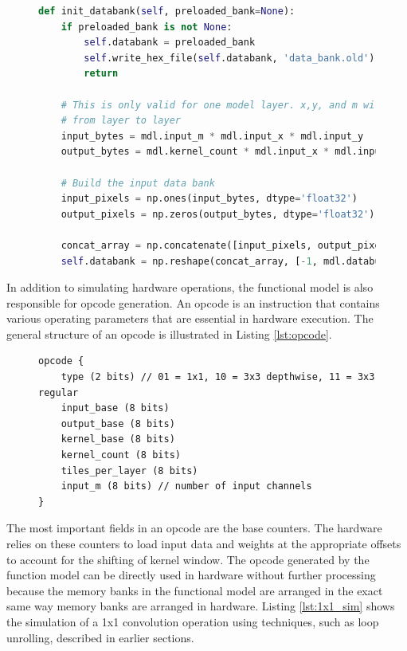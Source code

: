 \documentclass{uw-ece-wkrpt}
\begin{document}
\begin{figure}
\centering
\begin{lstlisting}[caption={Databank initialization in software}, label=lst:databank_init, language=Python]
def init_databank(self, preloaded_bank=None):
    if preloaded_bank is not None:
        self.databank = preloaded_bank
        self.write_hex_file(self.databank, 'data_bank.old')
        return

    # This is only valid for one model layer. x,y, and m will change
    # from layer to layer
    input_bytes = mdl.input_m * mdl.input_x * mdl.input_y
    output_bytes = mdl.kernel_count * mdl.input_x * mdl.input_y

    # Build the input data bank
    input_pixels = np.ones(input_bytes, dtype='float32')
    output_pixels = np.zeros(output_bytes, dtype='float32')

    concat_array = np.concatenate([input_pixels, output_pixels])
    self.databank = np.reshape(concat_array, [-1, mdl.databus_size])
\end{lstlisting}
\end{figure}

In addition to simulating hardware operations, the functional model is also responsible for opcode generation. An opcode is an instruction that contains various operating parameters that are essential in hardware execution. The general structure of an opcode is illustrated in Listing \ref{lst:opcode}.

\begin{figure}
\centering
\begin{lstlisting}[caption={General opcode format}, label=lst:opcode]
opcode {
    type (2 bits) // 01 = 1x1, 10 = 3x3 depthwise, 11 = 3x3 regular
    input_base (8 bits)
    output_base (8 bits)
    kernel_base (8 bits)
    kernel_count (8 bits)
    tiles_per_layer (8 bits)
    input_m (8 bits) // number of input channels
}
\end{lstlisting}
\end{figure}

The most important fields in an opcode are the base counters. The hardware relies on these counters to load input data and weights at the appropriate offsets to account for the shifting of \gls{kernel} window. The opcode generated by the function model can be directly used in hardware without further processing because the memory banks in the functional model are arranged in the exact same way memory banks are arranged in hardware. Listing \ref{lst:1x1_sim} shows the simulation of a 1x1 convolution operation using techniques, such as loop unrolling, described in earlier sections.
\end{document}
